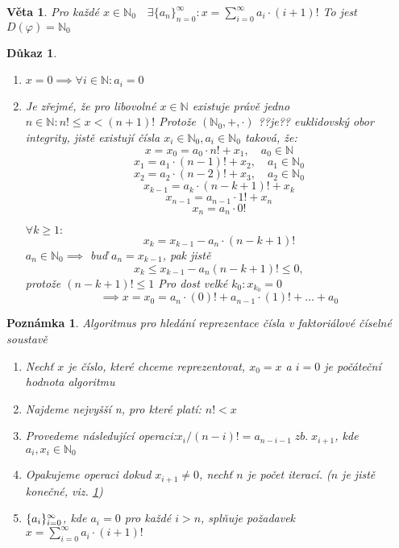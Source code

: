 \documentclass[12pt]{book}
\newtheorem{veta}{Věta}
\newtheorem*{dukaz}{Důkaz}
\newtheorem{pozn}{Poznámka}
\begin{document}
\begin{veta}
	Pro každé $x \in \mathbb{N}_0 \quad \exists\{a_n\}_{n=0}^\infty:x=
	 \sum_{i=0}^{\infty}a_i\cdot(i+1)!$
	To jest $D(\varphi)=\mathbb{N}_0$
\end{veta}
\begin{dukaz}\label{faktDF}
	\begin{enumerate}
		\item[$\alpha)$] $x=0 \implies \forall i \in \mathbb{N}:a_i=0$
		\item[$\beta)$] Je zřejmé, že pro libovolné $x \in \mathbb{N}$ existuje právě jedno $n\in\mathbb{N}:n!\le x<(n+1)!$\newline
		Protože $(\mathbb{N}_0,+,\cdot)$ ??je?? euklidovský obor integrity, jistě existují čísla $x_i\in\mathbb{N}_0, a_i\in\mathbb{N}_0$ taková, že:
		$$ x = x_0 = a_0 \cdot n! + x_1,\quad a_0 \in \mathbb{N}$$
		$$ x_1 = a_1 \cdot(n-1)! + x_2,\quad a_1 \in \mathbb{N}_0$$
		$$ x_2 = a_2 \cdot(n-2)! + x_3,\quad a_2 \in \mathbb{N}_0$$
		$$ x_{k-1} = a_k \cdot (n-k+1)! + x_{k}$$
		$$ x_{n-1} = a_{n-1} \cdot 1! + x_{n}$$
		$$ x_{n} = a_{n} \cdot 0!$$
		
		$\forall k \ge 1:$
		$$x_k=x_{k-1}-a_n\cdot(n-k+1)!$$
		$a_n \in \mathbb{N}_0 \implies$ buď $a_n = x_{k-1}$, pak jistě
		$$x_k \le x_{k-1}-a_n(n-k+1)! \le 0,$$
		protože $(n-k+1)! \le 1$\newline
		Pro dost velké $k_0: x_{k_0} = 0$
		$$\implies x = x_0 = a_n\cdot(0)!+a_{n-1}\cdot(1)!+\dots+a_0$$
	\end{enumerate}
\end{dukaz}
\begin{pozn} Algoritmus pro hledání reprezentace čísla v faktoriálové číselné soustavě
	\begin{enumerate}
		\item Nechť $x$ je číslo, které chceme reprezentovat, $x_0 = x$ a $i=0$ je počáteční hodnota algoritmu
		\item Najdeme nejvyšší n, pro které platí: $n! < x$		
		\item Provedeme následující operaci:\newline $x_i/(n-i)!=a_{n-i-1}\;zb.\;x_{i+1}$, kde $ a_i,x_i\in\mathbb{N}_0$
		\item Opakujeme operaci dokud $x_{i+1}\ne0$, nechť $n$ je počet iterací. ($n$ je jistě konečné, viz. \ref{faktDF})
		\item $\{a_i\}_{i=0}^{\infty}$, kde $a_i=0$ pro každé $i>n$, splňuje požadavek $x=
		\sum_{i=0}^{\infty}a_i\cdot(i+1)!$
	\end{enumerate}
\end{pozn}
\end{document}
